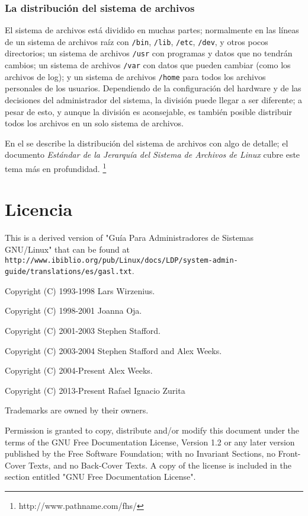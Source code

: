 \documentclass[12pt]{article}
\begin{document}
\subsubsection{ La distribución del sistema de archivos}

 El sistema de archivos está dividido en muchas partes; normalmente en las
líneas de un sistema de archivos raíz con \texttt{/bin},
\texttt{/lib}, \texttt{/etc}, \texttt{/dev},
y otros pocos directorios; un sistema de archivos \texttt{/usr} con programas y datos que
no tendrán cambios; un sistema de archivos \texttt{/var} con datos que pueden cambiar
(como los archivos de log); y un sistema de archivos \texttt{/home}
para todos los archivos personales de los usuarios. Dependiendo de la
configuración del hardware y de las decisiones del administrador del sistema, la
división puede llegar a ser diferente; a pesar de esto, y aunque la división es
aconsejable, es también posible distribuir todos los archivos en un solo sistema
de archivos.  

 En el 
se describe la distribución del sistema de archivos con
algo de detalle; el documento \textit{Estándar de la Jerarquía del Sistema de Archivos
de Linux} cubre este tema más en profundidad.
\footnote{http://www.pathname.com/fhs/}

\section{Licencia}
This is a derived version of "Guía Para Administradores de Sistemas GNU/Linux" that 
can be found at \\ \texttt{http://www.ibiblio.org/pub/Linux/docs/LDP/system-admin-guide/translations/es/gasl.txt}.

Copyright (C) 1993-1998 Lars Wirzenius.

Copyright (C) 1998-2001 Joanna Oja.

Copyright (C) 2001-2003 Stephen Stafford.

Copyright (C) 2003-2004 Stephen Stafford and Alex Weeks.

Copyright (C) 2004-Present Alex Weeks.

Copyright (C) 2013-Present Rafael Ignacio Zurita

Trademarks are owned by their owners.

Permission is granted to copy, distribute and/or modify this document under
the terms of the GNU Free Documentation License, Version 1.2 or any later
version published by the Free Software Foundation; with no Invariant
Sections, no Front-Cover Texts, and no Back-Cover Texts. A copy of the
license is included in the section entitled "GNU Free Documentation License".
\end{document}
